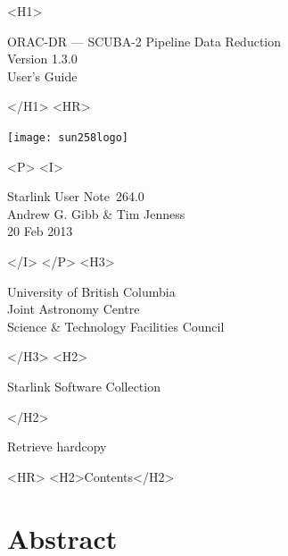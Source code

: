 \documentclass[twoside,11pt]{article}
\newcommand{\stardoccategory}  {Starlink User Note}
\newcommand{\stardocsource}    {sun\stardocnumber}
\newcommand{\stardocnumber}    {264.0}
\newcommand{\stardocauthors}   {Andrew G. Gibb \& Tim Jenness}
\newcommand{\stardocdate}      {20 Feb 2013}
\newcommand{\stardoctitle}     {ORAC-DR --- SCUBA-2 Pipeline Data Reduction}
\newcommand{\stardocversion}   {Version 1.3.0}
\newcommand{\stardocmanual}    {User's Guide}
\newcommand{\htmladdnormallink}[2]{#1}
\newcommand{\htmladdimg}[1]{}
\newcommand{\htmlref}[2]{#1}
\newcommand{\htmladdtonavigation}[1]{}
\newcommand{\xlabel}[1]{}
\renewcommand{\_}{\texttt{\symbol{95}}}
\begin{document}
\begin{htmlonly}
   \xlabel{}
   \begin{rawhtml} <H1> \end{rawhtml}
      \stardoctitle\\
      \stardocversion\\
      \stardocmanual
   \begin{rawhtml} </H1> <HR> \end{rawhtml}

\texttt{[image: sun258\_logo]}

   \begin{rawhtml} <P> <I> \end{rawhtml}
   \stardoccategory\ \stardocnumber \\
   \stardocauthors \\
   \stardocdate
   \begin{rawhtml} </I> </P> <H3> \end{rawhtml}
      \htmladdnormallink{University of British Columbia}
                        {http://www.ubc.ca} \\
      \htmladdnormallink{Joint Astronomy Centre}
                        {http://www.jach.hawaii.edu}\\
      \htmladdnormallink{Science \& Technology Facilities Council}
                        {http://www.stfc.ac.uk} \\
   \begin{rawhtml} </H3> <H2> \end{rawhtml}
      \htmladdnormallink{Starlink Software Collection}{http://starlink.jach.hawaii.edu/}
   \begin{rawhtml} </H2> \end{rawhtml}
   \htmladdnormallink{\htmladdimg{source.gif} Retrieve hardcopy}
      {http://starlink.jach.hawaii.edu/cgi-bin/hcserver?\stardocsource}\\

  \label{stardoccontents}
  \begin{rawhtml}
    <HR>
    <H2>Contents</H2>
  \end{rawhtml}
  \htmladdtonavigation{\htmlref{\htmladdimg{contents_motif.gif}}
        {stardoccontents}}

  \section{\xlabel{abstract}Abstract}
\end{htmlonly}
\end{document}
